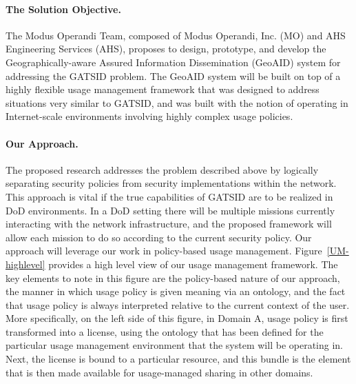 \documentclass{sbir}
\begin{document}
\clearpage
{}

\paragraph{The Solution Objective.} The Modus Operandi Team, composed of Modus Operandi, Inc. (MO) and AHS Engineering Services (AHS), proposes to design, prototype, and develop the Geographically-aware Assured Information Dissemination (GeoAID) system for addressing the GATSID problem. The GeoAID system will be built on top of a highly flexible usage management framework that was designed to address situations very similar to GATSID, and was built with the notion of operating in Internet-scale environments involving highly complex usage policies.

\paragraph{Our Approach.} The proposed research addresses the problem described above by logically separating security policies from security implementations within the network. This approach is vital if the true capabilities of GATSID are to be realized in DoD environments. In a DoD setting there will be multiple missions currently interacting with the network infrastructure, and the proposed framework will allow each mission to do so according to the current security policy. Our approach will leverage our work in policy-based usage management. Figure~\ref{UM-highlevel} provides a high level view of our usage management framework. The key elements to note in this figure are the policy-based nature of our approach, the manner in which usage policy is given meaning via an ontology, and the fact that usage policy is always interpreted relative to the current context of the user. More specifically, on the left side of this figure, in Domain A, usage policy is first transformed into a license, using the ontology that has been defined for the particular usage management environment that the system will be operating in. Next, the license is bound to a particular resource, and this bundle is the element that is then made available for usage-managed sharing in other domains.
\end{document}
